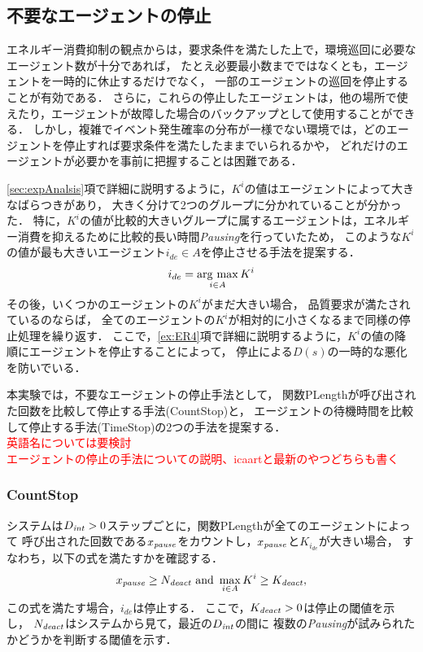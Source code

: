 \documentclass[12pt,a4j,twoside]{jarticle}
\newcommand{\argmax}{\mathop{\rm arg~max}\limits}
\def\AgentSet{A}
\def\DeactCheckInterval{D_{\it int}}
\def\PauseCount{x_{\it pause}}
\def\DeactCount{N_{\it deact}}
\def\DeactThreshold{K_{\it deact}}
\def\red#1{\textcolor{red}{#1}}
\begin{document}
  \subsection{不要なエージェントの停止}\label{sec:deactivation}
  エネルギー消費抑制の観点からは，要求条件を満たした上で，環境巡回に必要なエージェント数が十分であれば，
  たとえ必要最小数までではなくとも，エージェントを一時的に休止するだけでなく，
  一部のエージェントの巡回を停止することが有効である．
  さらに，これらの停止したエージェントは，他の場所で使えたり，エージェントが故障した場合のバックアップとして使用することができる．
  しかし，複雑でイベント発生確率の分布が一様でない環境では，どのエージェントを停止すれば要求条件を満たしたままでいられるかや，
  どれだけのエージェントが必要かを事前に把握することは困難である．
  \par

  \ref{sec:expAnalsis}項で詳細に説明するように，$K^i$の値はエージェントによって大きなばらつきがあり，
  大きく分けて2つのグループに分かれていることが分かった．
  特に，$K^i$の値が比較的大きいグループに属するエージェントは，エネルギー消費を抑えるために比較的長い時間{\em Pausing}を行っていたため，
  このような$K^i$の値が最も大きいエージェント$i_{de}\in\AgentSet$を停止させる手法を提案する．
  \begin{equation}
    i_{de} = \argmax_{i\in\AgentSet} K^i
  \end{equation}
  その後，いくつかのエージェントの$K^i$がまだ大きい場合，
  品質要求が満たされているのならば，
  全てのエージェントの$K^i$が相対的に小さくなるまで同様の停止処理を繰り返す．
  ここで，\ref{ex:ER4}項で詳細に説明するように，$K^i$の値の降順にエージェントを停止することによって，
  停止による$D(s)$の一時的な悪化を防いでいる．
  \par

  本実験では，不要なエージェントの停止手法として，
  関数\textsf{PLength}が呼び出された回数を比較して停止する手法(CountStop)と，
  エージェントの待機時間を比較して停止する手法(TimeStop)の2つの手法を提案する．
  \\ \red{英語名については要検討}\\
  \red{エージェントの停止の手法についての説明、icaartと最新のやつどちらも書く}\\


  \subsubsection{CountStop}\label{sec:CountStop}
  システムは$\DeactCheckInterval>0$ステップごとに，関数\textsf{PLength}が全てのエージェントによって
  呼び出された回数である$\PauseCount$をカウントし，$\PauseCount$と$K_{i_{de}}$が大きい場合，
  すなわち，以下の式を満たすかを確認する．
  \begin{equation}
    \PauseCount \geq \DeactCount \textrm{ and } \max_{i\in\AgentSet}
    K^i \geq \DeactThreshold,
  \end{equation}
  この式を満たす場合，$i_{de}$は停止する．
  ここで，$\DeactThreshold > 0$は停止の閾値を示し，
  $\DeactCount$はシステムから見て，最近の$\DeactCheckInterval$の間に
  複数の{\em Pausing}が試みられたかどうかを判断する閾値を示す．
  
\end{document}
